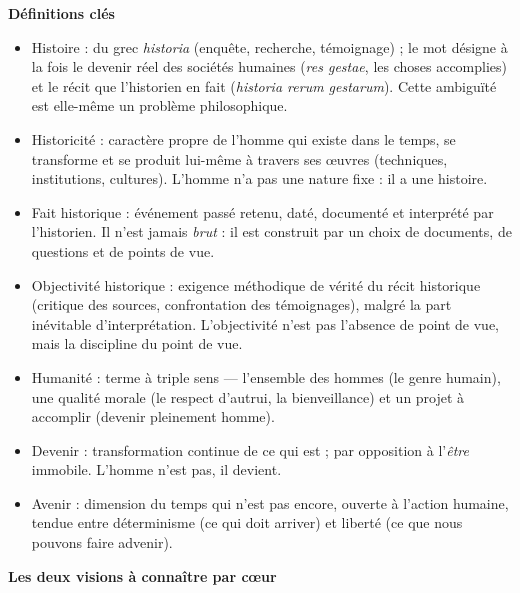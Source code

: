 \documentclass[11pt]{article}
\newcommand{\cle}[1]{{\popxbold\color{popdark}#1}}
\begin{document}
\begin{aretenir}
\textbf{Définitions clés}
\begin{itemize}
  \item \cle{Histoire} : du grec \emph{historia} (enquête, recherche, témoignage) ; le mot désigne à la fois le devenir réel des sociétés humaines (\emph{res gestae}, les choses accomplies) et le récit que l'historien en fait (\emph{historia rerum gestarum}). Cette ambiguïté est elle-même un problème philosophique.
  \item \cle{Historicité} : caractère propre de l'homme qui existe dans le temps, se transforme et se produit lui-même à travers ses œuvres (techniques, institutions, cultures). L'homme n'a pas une nature fixe : il a une histoire.
  \item \cle{Fait historique} : événement passé retenu, daté, documenté et interprété par l'historien. Il n'est jamais \emph{brut} : il est construit par un choix de documents, de questions et de points de vue.
  \item \cle{Objectivité historique} : exigence méthodique de vérité du récit historique (critique des sources, confrontation des témoignages), malgré la part inévitable d'interprétation. L'objectivité n'est pas l'absence de point de vue, mais la discipline du point de vue.
  \item \cle{Humanité} : terme à triple sens --- l'ensemble des hommes (le genre humain), une qualité morale (le respect d'autrui, la bienveillance) et un projet à accomplir (devenir pleinement homme).
  \item \cle{Devenir} : transformation continue de ce qui est ; par opposition à l'\emph{être} immobile. L'homme n'est pas, il devient.
  \item \cle{Avenir} : dimension du temps qui n'est pas encore, ouverte à l'action humaine, tendue entre déterminisme (ce qui doit arriver) et liberté (ce que nous pouvons faire advenir).
\end{itemize}

\textbf{Les deux visions à connaître par cœur}


\end{aretenir}
\end{document}

